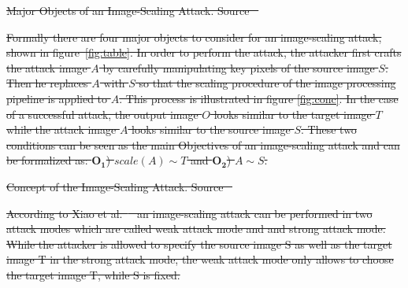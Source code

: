 \documentclass[sigconf]{acmart}
\providecommand{\DIFdel}[1]{{\protect\color{red}\sout{#1}}}                      %
\providecommand{\DIFdelFL}[1]{\DIFdel{#1}} %
\begin{document}
{%
\DIFdelFL{Major Objects of an Image-Scaling Attack. Source \mbox{%
\cite{imgscale}}\hspace{0pt}%
}}

\DIFdel{Formally there are four major objects to consider for an image-scaling attack, shown in figure~\ref{fig:table}.
In order to perform the attack, the attacker first crafts the attack image $A$ by carefully manipulating key pixels of the source image $S$.
Then he replaces $A$ with $S$ so that the scaling procedure of the image processing pipeline is applied to $A$.
This process is illustrated in figure \ref{fig:conc}.
In the case of a successful attack, the output image $O$ looks similar to the target image $T$ while the attack image $A$ looks similar to the source image $S$.
These two conditions can be seen as the main Objectives of an image-scaling attack and can be formalized as:
$\boldsymbol{O_1}$) $scale(A) \sim T$ and $\boldsymbol{O_2}$) $A \sim S$.
}%

{%
\DIFdelFL{Concept of the Image-Scaling Attack. Source \mbox{%
\cite{imgscale}}\hspace{0pt}%
}}

\DIFdel{According to Xiao et al.\mbox{%
\cite{camouflage} }\hspace{0pt}%
an image-scaling attack can be performed in two attack modes which are called weak attack mode and and strong attack mode.
While the attacker is allowed to specify the source image S as well as the target image T in the strong attack mode, the weak attack mode only allows to choose the target image T, while S is fixed.
}%
\end{document}
